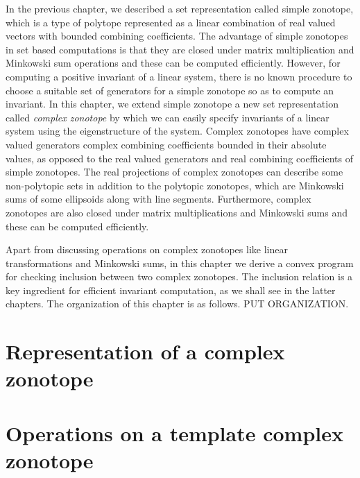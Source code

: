 In the previous chapter, we described a set representation called
simple zonotope, which is a type of polytope represented as a linear
combination of real valued vectors with bounded combining
coefficients.  The advantage of simple zonotopes in set based
computations is that they are closed under matrix multiplication and
Minkowski sum operations and these can be computed efficiently.
However, for computing a positive invariant of a linear system, there
is no known procedure to choose a suitable set of generators for a
simple zonotope so as to compute an invariant.  In this chapter, we
extend simple zonotope a new set representation called \emph{complex
zonotope} by which we can easily specify invariants of a linear system
using the eigenstructure of the system.  Complex zonotopes have
complex valued generators complex combining coefficients bounded in
their absolute values, as opposed to the real valued generators and
real combining coefficients of simple zonotopes.  The real projections
of complex zonotopes can describe some non-polytopic sets in addition
to the polytopic zonotopes, which are Minkowski sums of some
ellipsoids along with line segments.  Furthermore, complex zonotopes
are also closed under matrix multiplications and Minkowski sums and
these can be computed efficiently.

Apart from discussing operations on complex zonotopes like linear
transformations and Minkowski sums, in this chapter we derive a convex
program for checking inclusion between two complex zonotopes.  The
inclusion relation is a key ingredient for efficient invariant
computation, as we shall see in the latter chapters.  The organization
of this chapter is as follows.  PUT ORGANIZATION.

\section{Representation of a complex zonotope}


\section{Operations on a template complex zonotope}


